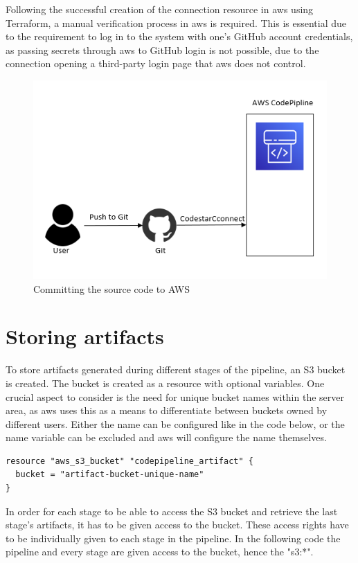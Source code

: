 Following the successful creation of the connection resource in \acrshort{aws} using Terraform, a manual verification process in \acrshort{aws} is required. This is essential due to the requirement to log in to the system with one's GitHub account credentials, as passing secrets through \acrshort{aws} to GitHub login is not possible, due to the connection opening a third-party login page that \acrshort{aws} does not control.

\vspace{2mm}
\begin{figure}[H]
    \centering
    \includegraphics[width=0.6\columnwidth]{Images/aws-piplin-2-1.png}
    \caption{Committing the source code to AWS}
    \label{fig: Committing the source code to AWS}
\end{figure}

\section{Storing artifacts}
To store \gls{artifact}s generated during different stages of the pipeline, an S3 bucket is created. The bucket is created as a resource with optional variables. One crucial aspect to consider is the need for unique bucket names within the server area, as \acrshort{aws} uses this as a means to differentiate between buckets owned by different users. Either the name can be configured like in the code below, or the name variable can be excluded and \acrshort{aws} will configure the name themselves.

\begin{tcolorbox}
\begin{verbatim}
resource "aws_s3_bucket" "codepipeline_artifact" {
  bucket = "artifact-bucket-unique-name"
}
\end{verbatim}
\end{tcolorbox}

In order for each stage to be able to access the S3 bucket and retrieve the last stage's \gls{artifact}s, it has to be given access to the bucket. These access rights have to be individually given to each stage in the pipeline. In the following code the pipeline and every stage are given access to the bucket, hence the "s3:*".

